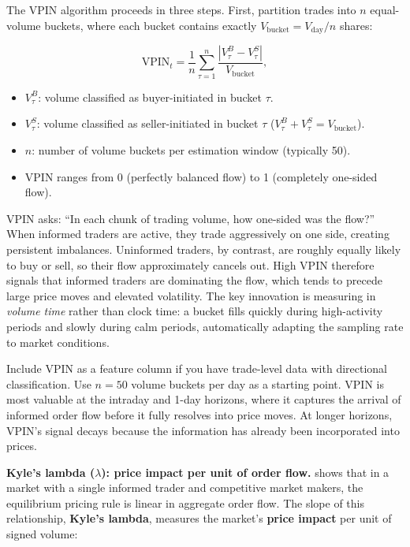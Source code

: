 The VPIN algorithm proceeds in three steps.
First, partition trades into $n$ equal-volume buckets, where each bucket contains exactly $V_{\text{bucket}} = V_{\text{day}} / n$ shares:

\begin{equation}\label{eq:vpin}
\text{VPIN}_t = \frac{1}{n} \sum_{\tau=1}^{n} \frac{|V_\tau^B - V_\tau^S|}{V_{\text{bucket}}},
\end{equation}
\begin{itemize}[nosep]
  \item $V_\tau^B$: volume classified as buyer-initiated in bucket $\tau$.
  \item $V_\tau^S$: volume classified as seller-initiated in bucket $\tau$ ($V_\tau^B + V_\tau^S = V_{\text{bucket}}$).
  \item $n$: number of volume buckets per estimation window (typically 50).
  \item VPIN ranges from 0 (perfectly balanced flow) to 1 (completely one-sided flow).
\end{itemize}

\begin{intuition}
VPIN asks: ``In each chunk of trading volume, how one-sided was the flow?''
When informed traders are active, they trade aggressively on one side, creating persistent imbalances.
Uninformed traders, by contrast, are roughly equally likely to buy or sell, so their flow approximately cancels out.
High VPIN therefore signals that informed traders are dominating the flow, which tends to precede large price moves and elevated volatility.
The key innovation is measuring in \emph{volume time} rather than clock time: a bucket fills quickly during high-activity periods and slowly during calm periods, automatically adapting the sampling rate to market conditions.
\end{intuition}

\begin{projectconnection}
Include VPIN as a feature column if you have trade-level data with directional classification.
Use $n = 50$ volume buckets per day as a starting point.
VPIN is most valuable at the intraday and 1-day horizons, where it captures the arrival of informed order flow before it fully resolves into price moves.
At longer horizons, VPIN's signal decays because the information has already been incorporated into prices.
\end{projectconnection}

\textbf{Kyle's lambda ($\lambda$): price impact per unit of order flow.}
\citet{Kyle1985} shows that in a market with a single informed trader and competitive market makers, the equilibrium pricing rule is linear in aggregate order flow.
The slope of this relationship, \textbf{Kyle's lambda}, measures the market's \textbf{price impact} per unit of signed volume:

